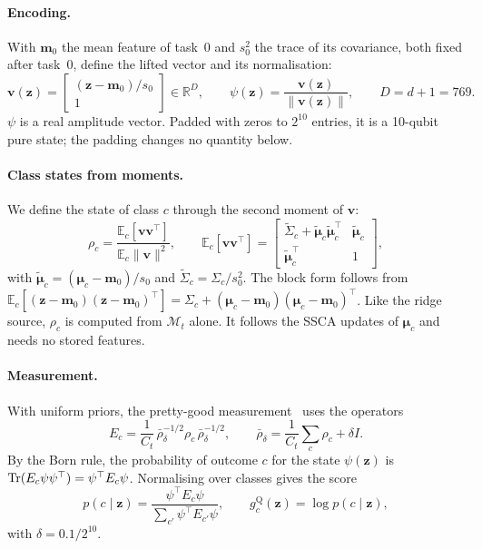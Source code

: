 \paragraph{Encoding.}
With $\mathbf m_0$ the mean feature of task~0 and $s_0^2$ the trace of its
covariance, both fixed after task~0, define the lifted vector and its
normalisation:
\begin{equation}
  \mathbf v(\mathbf z)=\begin{bmatrix}(\mathbf z-\mathbf m_0)/s_0\\ 1\end{bmatrix}\in\mathbb R^{D},
  \qquad
  \psi(\mathbf z)=\frac{\mathbf v(\mathbf z)}{\|\mathbf v(\mathbf z)\|},
  \qquad D=d+1=769.
  \label{eq:encoding}
\end{equation}
$\psi$ is a real amplitude vector. Padded with zeros to $2^{10}$ entries, it
is a 10-qubit pure state; the padding changes no quantity below.

\paragraph{Class states from moments.}
We define the state of class $c$ through the second moment of $\mathbf v$:
\begin{equation}
  \rho_c=\frac{\mathbb E_c[\mathbf v\mathbf v^{\top}]}{\mathbb E_c\|\mathbf v\|^2},
  \qquad
  \mathbb E_c[\mathbf v\mathbf v^{\top}]=
  \begin{bmatrix}\tilde\Sigma_c+\tilde{\boldsymbol\mu}_c\tilde{\boldsymbol\mu}_c^{\top} & \tilde{\boldsymbol\mu}_c\\
  \tilde{\boldsymbol\mu}_c^{\top} & 1\end{bmatrix},
  \label{eq:state}
\end{equation}
with $\tilde{\boldsymbol\mu}_c=(\boldsymbol\mu_c-\mathbf m_0)/s_0$ and
$\tilde\Sigma_c=\Sigma_c/s_0^2$. The block form follows from
$\mathbb E_c[(\mathbf z-\mathbf m_0)(\mathbf z-\mathbf m_0)^{\top}]=\Sigma_c+(\boldsymbol\mu_c-\mathbf m_0)(\boldsymbol\mu_c-\mathbf m_0)^{\top}$.
Like the ridge source, $\rho_c$ is computed from $\mathcal M_t$ alone. It
follows the SSCA updates of $\boldsymbol\mu_c$ and needs no stored features.

\paragraph{Measurement.}
With uniform priors, the pretty-good measurement~\cite{hausladen1994pgm} uses
the operators
\begin{equation}
  E_c=\frac1{C_t}\,\bar\rho_\delta^{-1/2}\rho_c\,\bar\rho_\delta^{-1/2},\qquad
  \bar\rho_\delta=\frac1{C_t}\sum_{c}\rho_c+\delta I .
  \label{eq:pgm-ops}
\end{equation}
By the Born rule, the probability of outcome $c$ for the state $\psi(\mathbf z)$ is
$\mathrm{Tr}(E_c\psi\psi^{\top})=\psi^{\top}E_c\psi$. Normalising over classes gives
the score
\begin{equation}
  p(c\mid\mathbf z)=\frac{\psi^{\top}E_c\psi}{\sum_{c'}\psi^{\top}E_{c'}\psi},
  \qquad g^{\mathrm{Q}}_c(\mathbf z)=\log p(c\mid\mathbf z),
  \label{eq:pgm}
\end{equation}
with $\delta=0.1/2^{10}$.

